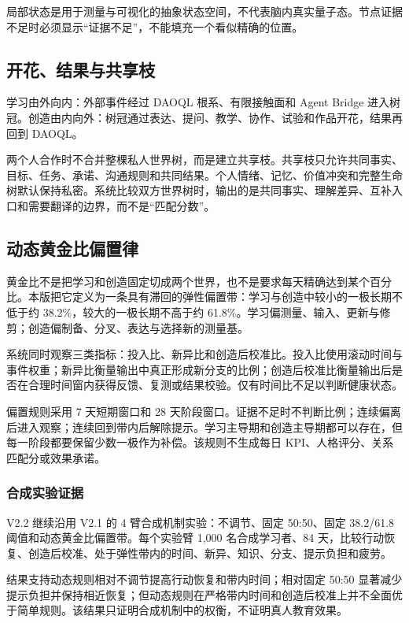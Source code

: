 \documentclass[UTF8,a4paper,11pt]{ctexart}
\begin{document}
局部状态是用于测量与可视化的抽象状态空间，不代表脑内真实量子态。节点证据不足时必须显示“证据不足”，不能填充一个看似精确的位置。

\subsection{开花、结果与共享枝}

学习由外向内：外部事件经过 DAOQL 根系、有限接触面和 Agent Bridge 进入树冠。创造由内向外：树冠通过表达、提问、教学、协作、试验和作品开花，结果再回到 DAOQL。

两个人合作时不合并整棵私人世界树，而是建立共享枝。共享枝只允许共同事实、目标、任务、承诺、沟通规则和共同结果。个人情绪、记忆、价值冲突和完整生命树默认保持私密。系统比较双方世界树时，输出的是共同事实、理解差异、互补入口和需要翻译的边界，而不是“匹配分数”。

\subsection{动态黄金比偏置律}

黄金比不是把学习和创造固定切成两个世界，也不是要求每天精确达到某个百分比。本版把它定义为一条具有滞回的弹性偏置带：学习与创造中较小的一极长期不低于约 38.2\%，较大的一极长期不高于约 61.8\%。学习偏测量、输入、更新与修剪；创造偏制备、分叉、表达与选择新的测量基。

系统同时观察三类指标：投入比、新异比和创造后校准比。投入比使用滚动时间与事件权重；新异比衡量输出中真正形成新分支的比例；创造后校准比衡量输出后是否在合理时间窗内获得反馈、复测或结果校验。仅有时间比不足以判断健康状态。

偏置规则采用 7 天短期窗口和 28 天阶段窗口。证据不足时不判断比例；连续偏离后进入观察；连续回到带内后解除提示。学习主导期和创造主导期都可以存在，但每一阶段都要保留少数一极作为补偿。该规则不生成每日 KPI、人格评分、关系匹配分或效果承诺。

\subsubsection{合成实验证据}

V2.2 继续沿用 V2.1 的 4 臂合成机制实验：不调节、固定 50:50、固定 38.2/61.8 阈值和动态黄金比偏置带。每个实验臂 1,000 名合成学习者、84 天，比较行动恢复、创造后校准、处于弹性带内的时间、新异、知识、分支、提示负担和疲劳。

结果支持动态规则相对不调节提高行动恢复和带内时间；相对固定 50:50 显著减少提示负担并保持相近恢复；但动态规则在严格带内时间和创造后校准上并不全面优于简单规则。该结果只证明合成机制中的权衡，不证明真人教育效果。
\end{document}
